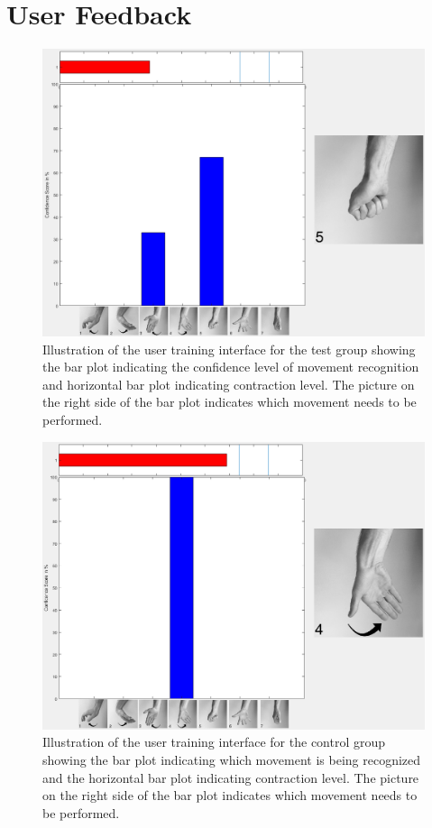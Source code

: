 \section{User Feedback}

\begin{figure}[H]                 
	\includegraphics[width=.8\textwidth]{figures/xBackground/usertraintestGUI}  
	\caption{Illustration of the user training interface for the test group showing the bar plot indicating the confidence level of movement recognition and horizontal bar plot indicating contraction level. The picture on the right side of the bar plot indicates which movement needs to be performed.}
	\label{fig:usertraintestGUI} 
\end{figure}


\begin{figure}[H]                 
	\includegraphics[width=.8\textwidth]{figures/xBackground/usertraincontrolGUI}  
	\caption{Illustration of the user training interface for the control group showing the bar plot indicating which movement is being recognized and the horizontal bar plot indicating contraction level. The picture on the right side of the bar plot indicates which movement needs to be performed.}
	\label{fig:usertraincontrolGUI} 
\end{figure}